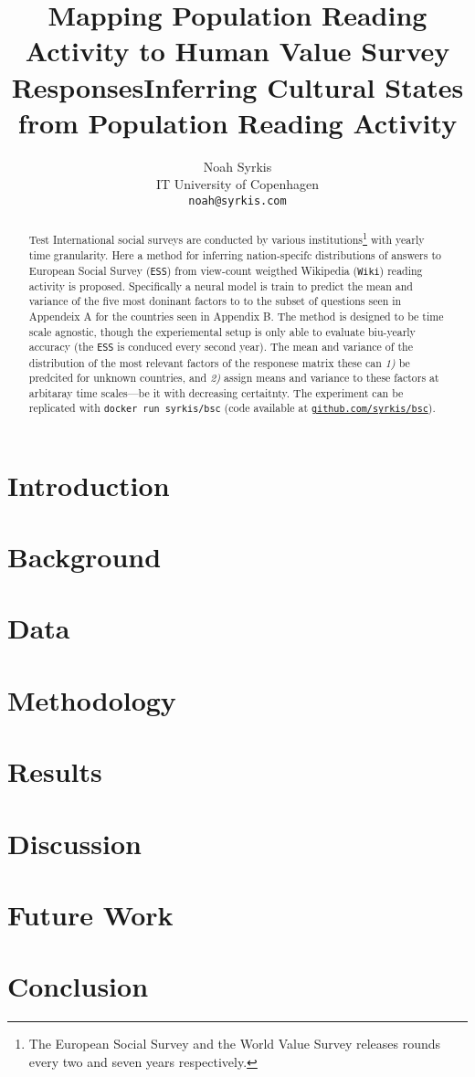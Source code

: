 \documentclass[11pt]{article}
\title{Mapping Population Reading Activity to Human Value Survey Responses}
\title{Inferring Cultural States from Population Reading Activity}
\author{Noah Syrkis \\
  IT University of Copenhagen \\
  \texttt{noah@syrkis.com} \\}
\begin{document}
\maketitle
\begin{abstract}
    Test International social surveys are conducted by various institutions\footnote{The European Social Survey and the World Value Survey releases rounds every two and seven years respectively.} with yearly time granularity.
    Here a method for inferring nation-specifc distributions of answers to European Social Survey (\texttt{ESS}) from view-count weigthed Wikipedia (\texttt{Wiki}) reading activity is proposed.
    Specifically a neural model is train to predict the mean and variance of the five most doninant factors to to the subset of questions seen in Appendeix A for the countries seen in Appendix B.
    The method is designed to be time scale agnostic, though the experiemental setup is only able to evaluate biu-yearly accuracy (the \texttt{ESS} is conduced every second year).
    The mean and variance of the distribution of the most relevant factors of the responese matrix these can \emph{1)} be predcited for unknown countries, and \emph{2)} assign means and variance to these factors at arbitaray time scales—be it with decreasing certaitnty.
    The experiment can be replicated with \texttt{docker run syrkis/bsc} (code available at \href{https://github.com/syrkis/bsc}{\texttt{github.com/syrkis/bsc}}).

\end{abstract}

\section{Introduction}


\section{Background}


\section{Data}


\section{Methodology}


\section{Results}


\section{Discussion}


\section{Future Work}


\section{Conclusion}



\end{document}
